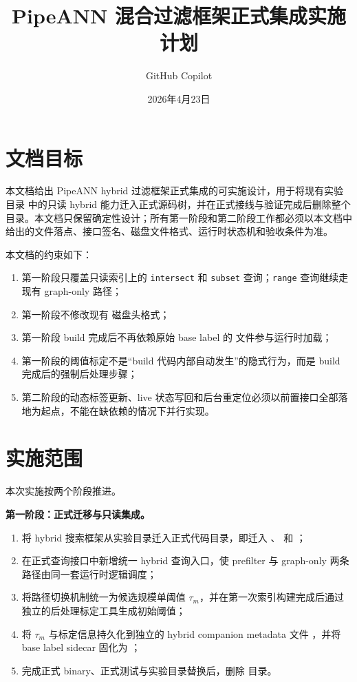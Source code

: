 \documentclass[UTF8]{ctexart}
\title{PipeANN 混合过滤框架正式集成实施计划}
\author{GitHub Copilot}
\date{2026年4月23日}
\begin{document}
\maketitle

\section{文档目标}
本文档给出 PipeANN hybrid 过滤框架正式集成的可实施设计，用于将现有实验目录  中的只读 hybrid 能力迁入正式源码树，并在正式接线与验证完成后删除整个  目录。本文档只保留确定性设计；所有第一阶段和第二阶段工作都必须以本文档中给出的文件落点、接口签名、磁盘文件格式、运行时状态机和验收条件为准。

本文档的约束如下：

\begin{enumerate}
\item 第一阶段只覆盖只读索引上的 \texttt{intersect} 和 \texttt{subset} 查询；\texttt{range} 查询继续走现有 graph-only 路径；
\item 第一阶段不修改现有  磁盘头格式；
\item 第一阶段 build 完成后不再依赖原始 base label 的  文件参与运行时加载；
\item 第一阶段的阈值标定不是“build 代码内部自动发生”的隐式行为，而是 build 完成后的强制后处理步骤；
\item 第二阶段的动态标签更新、live 状态写回和后台重定位必须以前置接口全部落地为起点，不能在缺依赖的情况下并行实现。
\end{enumerate}

\section{实施范围}
本次实施按两个阶段推进。

\textbf{第一阶段：正式迁移与只读集成。}

\begin{enumerate}
\item 将 hybrid 搜索框架从实验目录迁入正式代码目录，即迁入 、 和 ；
\item 在正式查询接口中新增统一 hybrid 查询入口，使 prefilter 与 graph-only 两条路径由同一套运行时逻辑调度；
\item 将路径切换机制统一为候选规模单阈值 \(\tau_m\)，并在第一次索引构建完成后通过独立的后处理标定工具生成初始阈值；
\item 将 \(\tau_m\) 与标定信息持久化到独立的 hybrid companion metadata 文件 ，并将 base label sidecar 固化为 ；
\item 完成正式 binary、正式测试与实验目录替换后，删除  目录。
\end{enumerate}
\end{document}
